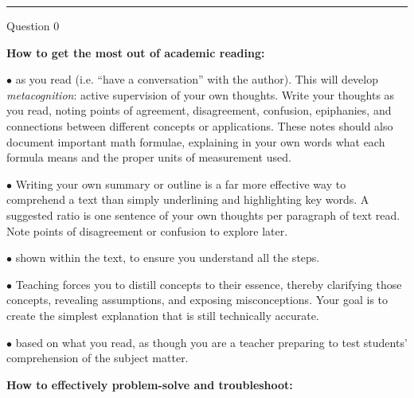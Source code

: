 


\hrule

\vskip 3pt

\noindent
Question 0

\vskip 10pt

\noindent
{\bf How to get the most out of academic reading:}

\item{$\bullet$}  as you read (i.e. ``have a conversation'' with the author).  This will develop {\it metacognition}: active supervision of your own thoughts.  Write your thoughts as you read, noting points of agreement, disagreement, confusion, epiphanies, and connections between different concepts or applications.  These notes should also document important math formulae, explaining in your own words what each formula means and the proper units of measurement used.
\vskip 5pt
\item{$\bullet$}   Writing your own summary or outline is a far more effective way to comprehend a text than simply underlining and highlighting key words.  A suggested ratio is one sentence of your own thoughts per paragraph of text read.  Note points of disagreement or confusion to explore later.
\vskip 5pt
\item{$\bullet$}  shown within the text, to ensure you understand all the steps.
\vskip 5pt
\item{$\bullet$}   Teaching forces you to distill concepts to their essence, thereby clarifying those concepts, revealing assumptions, and exposing misconceptions.  Your goal is to create the simplest explanation that is still technically accurate.
\vskip 5pt
\item{$\bullet$}  based on what you read, as though you are a teacher preparing to test students' comprehension of the subject matter.
\medskip

\vskip 10pt

\noindent
{\bf How to effectively problem-solve and troubleshoot:}

